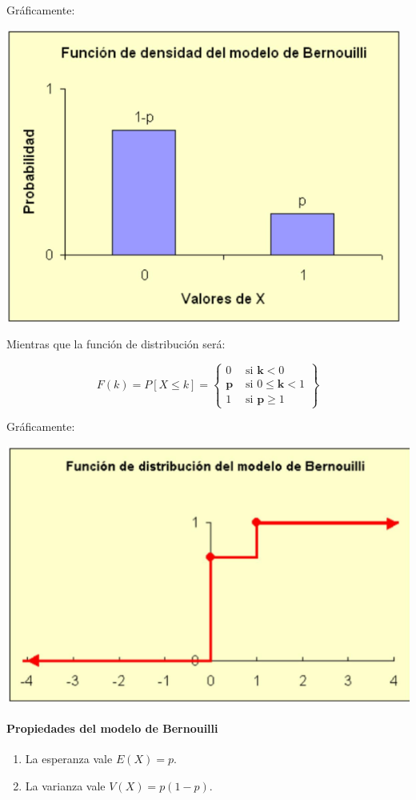 \documentclass[
]{article}
\providecommand{\tightlist}{%
  \setlength{\itemsep}{0pt}\setlength{\parskip}{0pt}}
\begin{document}
Gráficamente:

\includegraphics[width=0.8\linewidth]{images/fmpBernouilli}

Mientras que la función de distribución será:

\[
F(k)=P[X \leq k]=\left\{\begin{array}{lc}
0 & \text { si } \mathbf{k}<0 \\
\mathbf{p} & \text { si } 0 \leq \mathbf{k}<1 \\
1 & \text { si } \mathbf{p} \geq 1
\end{array}\right\}
\]

Gráficamente:

\includegraphics[width=0.8\linewidth]{images/cdfBernouilli}

\paragraph{Propiedades del modelo de Bernouilli}\label{propiedades-del-modelo-de-bernouilli}

\begin{enumerate}
\def\labelenumi{\arabic{enumi})}
\tightlist
\item
  La esperanza vale \(E(X)=p\).
\item
  La varianza vale \(V(X)=p(1-p)\).
\end{enumerate}
\end{document}
